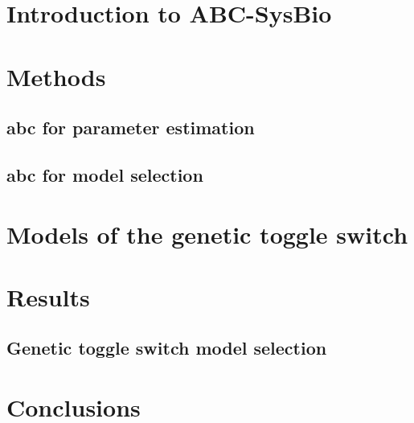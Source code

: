 \section{Introduction to ABC-SysBio}
\section{Methods}
\subsection{\acrshort{abc} for parameter estimation}
\subsection{\acrshort{abc} for model selection}
\section{Models of the genetic toggle switch}
\section{Results}
\subsection{Genetic toggle switch model selection}
\section{Conclusions}
